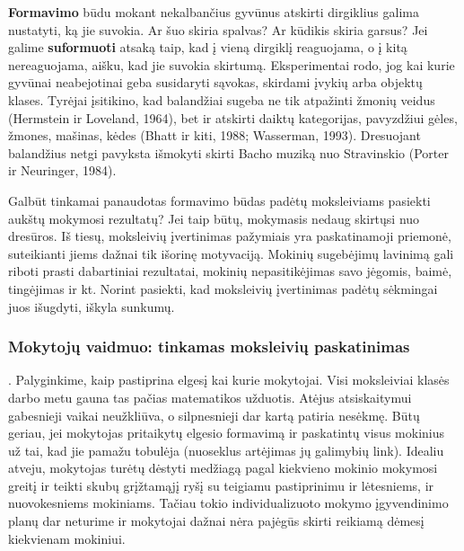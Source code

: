 \documentclass{article}
\begin{document}
\textbf{Formavimo} būdu mokant nekalbančius gyvūnus atskirti dirgiklius galima nustatyti, ką jie suvokia. Ar šuo skiria spalvas? Ar kūdikis skiria garsus? Jei galime \textbf{suformuoti} atsaką taip, kad į vieną dirgiklį reaguojama, o į kitą nereaguojama, aišku, kad jie suvokia skirtumą. Eksperimentai rodo, jog kai kurie gyvūnai neabejotinai geba susidaryti sąvokas, skirdami įvykių arba objektų klases. Tyrėjai įsitikino, kad balandžiai sugeba ne tik atpažinti žmonių veidus (Hermstein ir Loveland, 1964), bet ir atskirti daiktų kategorijas, pavyzdžiui gėles, žmones, mašinas, kėdes (Bhatt ir kiti, 1988; Wasserman, 1993). Dresuojant balandžius netgi pavyksta išmokyti skirti Bacho muziką nuo Stravinskio (Porter ir Neuringer, 1984). 

Galbūt tinkamai panaudotas formavimo būdas padėtų moksleiviams pasiekti aukštų mokymosi rezultatų? Jei taip būtų, mokymasis nedaug skirtųsi nuo dresūros. Iš tiesų, moksleivių įvertinimas pažymiais yra paskatinamoji priemonė, suteikianti jiems dažnai tik išorinę motyvaciją.  Mokinių sugebėjimų lavinimą gali riboti prasti dabartiniai rezultatai, mokinių nepasitikėjimas savo jėgomis, baimė, tingėjimas ir kt. Norint pasiekti, kad moksleivių įvertinimas padėtų sėkmingai juos išugdyti, iškyla sunkumų.

\subsubsection{Mokytojų vaidmuo: tinkamas moksleivių paskatinimas}. Palyginkime, kaip pastiprina elgesį kai kurie mokytojai. Visi moksleiviai klasės darbo metu gauna tas pačias matematikos užduotis. Atėjus atsiskaitymui gabesnieji vaikai neužkliūva, o silpnesnieji dar kartą patiria nesėkmę. Būtų geriau, jei mokytojas pritaikytų elgesio formavimą ir paskatintų visus mokinius už tai, kad jie pamažu tobulėja (nuoseklus artėjimas jų galimybių link). Idealiu atveju, mokytojas turėtų dėstyti medžiagą pagal kiekvieno mokinio mokymosi greitį ir teikti skubų grįžtamąjį ryšį su teigiamu pastiprinimu ir lėtesniems, ir nuovokesniems mokiniams. Tačiau tokio individualizuoto mokymo įgyvendinimo planų dar neturime ir mokytojai dažnai nėra pajėgūs skirti reikiamą dėmesį kiekvienam mokiniui.
\end{document}
